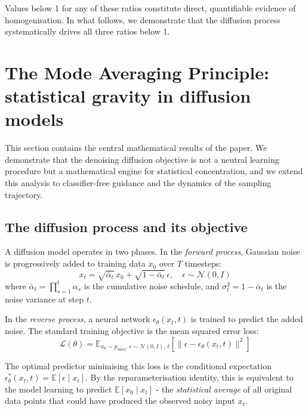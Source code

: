 \documentclass[11pt]{article}
\begin{document}
Values below 1 for any of these ratios constitute direct, quantifiable evidence of homogenisation. In what follows, we demonstrate that the diffusion process systematically drives all three ratios below 1.

\section{The Mode Averaging Principle: statistical gravity in diffusion models}\label{sec:map}

This section contains the central mathematical results of the paper. We demonstrate that the denoising diffusion objective is not a neutral learning procedure but a mathematical engine for statistical concentration, and we extend this analysis to classifier-free guidance and the dynamics of the sampling trajectory.

\subsection{The diffusion process and its objective}

A diffusion model \citep{Ho2020, Song2021} operates in two phases. In the \textit{forward process}, Gaussian noise is progressively added to training data $x_0$ over $T$ timesteps:
$$x_t = \sqrt{\bar{\alpha}_t}\, x_0 + \sqrt{1 - \bar{\alpha}_t}\, \epsilon, \quad \epsilon \sim \mathcal{N}(0, I)$$
where $\bar{\alpha}_t = \prod_{s=1}^t \alpha_s$ is the cumulative noise schedule, and $\sigma_t^2 = 1 - \bar{\alpha}_t$ is the noise variance at step $t$.

In the \textit{reverse process}, a neural network $\epsilon_\theta(x_t, t)$ is trained to predict the added noise. The standard training objective is the mean squared error loss:
$$\mathcal{L}(\theta) = \mathbb{E}_{x_0 \sim p_{\mathrm{data}},\, \epsilon \sim \mathcal{N}(0,I),\, t}\left[\|\epsilon - \epsilon_\theta(x_t, t)\|^2\right]$$

The optimal predictor minimising this loss is the conditional expectation $\epsilon_\theta^*(x_t, t) = \mathbb{E}[\epsilon \mid x_t]$. By the reparameterisation identity, this is equivalent to the model learning to predict $\mathbb{E}[x_0 \mid x_t]$ - the \textit{statistical average} of all original data points that could have produced the observed noisy input $x_t$.
\end{document}
